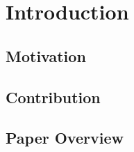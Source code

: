 
\section{Introduction}\label{sec:intro}
\subsection{Motivation}
  

\subsection{Contribution}

\subsection{Paper Overview}
